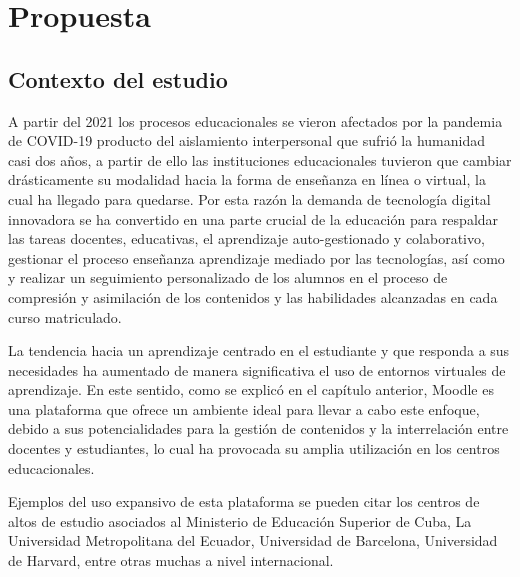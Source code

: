 \chapter{Propuesta}\label{chapter:proposal}

\section{Contexto del estudio}

A partir del 2021 los procesos educacionales se vieron afectados por la pandemia de COVID-19 producto del aislamiento interpersonal que sufrió la humanidad casi dos años, a partir de ello las instituciones educacionales tuvieron que cambiar drásticamente su modalidad hacia la forma de enseñanza en línea o virtual, la cual ha llegado para quedarse. Por esta razón la demanda de tecnología digital innovadora se ha convertido en una parte crucial de la educación para respaldar las tareas docentes, educativas, el aprendizaje auto-gestionado y colaborativo, gestionar el proceso enseñanza aprendizaje mediado por las tecnologías, así como y  realizar un seguimiento personalizado de los alumnos en el proceso de compresión y asimilación de los contenidos y las habilidades alcanzadas en  cada curso matriculado.  


La tendencia hacia un aprendizaje centrado en el estudiante y que responda a sus necesidades ha aumentado de manera significativa el uso de entornos virtuales de aprendizaje. En este sentido, como se explicó en el capítulo anterior, Moodle es una plataforma que ofrece un ambiente ideal para llevar a cabo este enfoque, debido a sus potencialidades para la gestión de contenidos y la interrelación entre docentes y estudiantes, lo cual ha provocada su amplia utilización en los centros educacionales.  


Ejemplos del uso expansivo de esta plataforma se pueden citar los centros de altos de estudio asociados al Ministerio de Educación Superior de Cuba, La Universidad Metropolitana del Ecuador, Universidad de Barcelona,  Universidad de Harvard, entre otras muchas a nivel internacional.   


